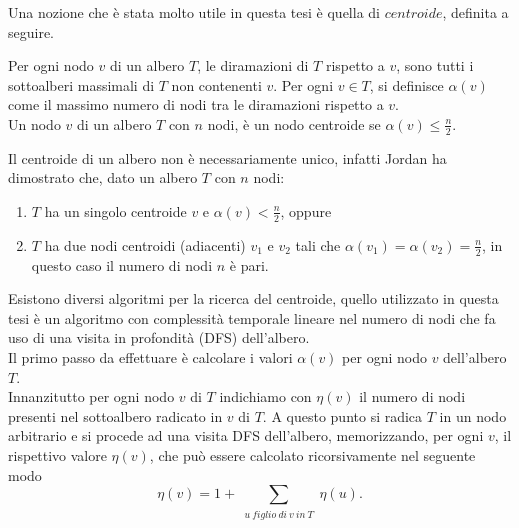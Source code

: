 Una nozione che è stata molto utile in questa tesi è quella di $ centroide $, definita a seguire.

\begin{definizione}
Per ogni nodo $ v $ di un albero $ T $, le diramazioni di $ T $  rispetto a $ v $, sono tutti i sottoalberi massimali di $ T $ non contenenti $ v $. 
Per ogni $ v \in T $, si definisce $\alpha(v)$ come il massimo numero di nodi tra le diramazioni rispetto a $ v $.\\ %
Un nodo $ v $ di un albero $ T $ con $ n $ nodi, \`e un nodo centroide se $\alpha(v)\le\frac{n}{2}$.
\end{definizione}

Il centroide di un albero non \`e necessariamente unico, infatti Jordan \cite{jordan1869assemblages}  ha dimostrato che, dato un albero $ T $ con $ n $ nodi:
\begin{enumerate}
	\renewcommand{\labelenumi}{\roman{enumi}}
	\item $ T $ ha un singolo centroide $ v $ e $\alpha(v) < \frac{n}{2}$, oppure
	\item$ T $ ha due nodi centroidi (adiacenti) $v_1$ e $v_2$ tali che $\alpha(v_1) = \alpha(v_2) = \frac{n}{2}$, in questo caso il numero di nodi $ n $ \`e pari.
\end{enumerate}

Esistono diversi algoritmi per la ricerca del centroide, quello utilizzato in questa tesi \`e un algoritmo con complessit\`a temporale lineare nel numero di nodi che fa uso di una visita in profondità (DFS) dell'albero. \\
Il primo passo da effettuare \`e calcolare i valori $\alpha(v)$ per ogni nodo $ v$ dell'albero $T$.\\
Innanzitutto per ogni nodo $v$ di $T $ indichiamo con $ \eta(v) $ il numero di nodi presenti nel sottoalbero radicato in $ v $ di $ T $.
A questo punto si radica $T$ in un nodo arbitrario e si procede ad una visita DFS dell'albero, memorizzando, per ogni $v$, il rispettivo valore $ \eta(v) $, che può essere calcolato ricorsivamente nel seguente modo 
\begin{equation}
\label{eq:eta_centroide}
\eta(v) = 1 + \sum_{\substack{u \ figlio \ di \ v \ in \ T} } { \eta(u)}.
\end{equation}

